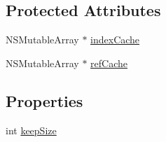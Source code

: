 \subsection*{Protected Attributes}
\begin{DoxyCompactItemize}
\item 
N\-S\-Mutable\-Array $\ast$ \hyperlink{interface_reference_cache_manager_aaec0cd743cb0ecc7e1c6699c494b8781}{index\-Cache}
\item 
N\-S\-Mutable\-Array $\ast$ \hyperlink{interface_reference_cache_manager_a4e814c2d19262e5df73f96cd06b0ba76}{ref\-Cache}
\end{DoxyCompactItemize}
\subsection*{Properties}
\begin{DoxyCompactItemize}
\item 
int \hyperlink{interface_reference_cache_manager_abf7683f360927e39bc1d76b1554b22e0}{keep\-Size}
\end{DoxyCompactItemize}


